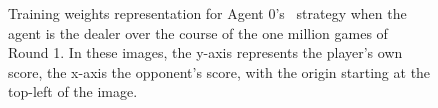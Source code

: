 \begin{figure}
\caption{%
	Training weights representation for Agent 0's \handmaxavg\
	strategy when the agent is the dealer
	over the course of the one million games of Round 1.
	In these images, the y-axis represents the player's own score,
	the x-axis the opponent's score,
	with the origin starting at the top-left of the image.
}
\label{fig_r1-flip}
\end{figure}
